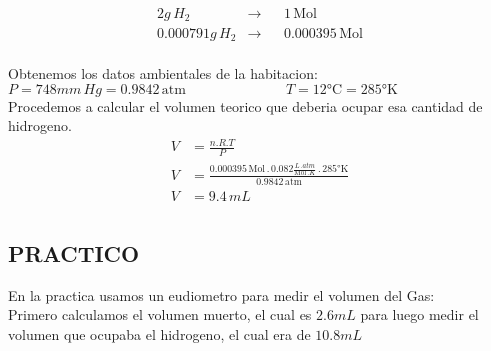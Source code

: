 \documentclass[12pt]{report}
\begin{document}
$$
\begin{aligned}
    2g \, H_2  &\rightarrow&& 1 \, \text{Mol} \\[6pt]
    0.000791g \, H_2 &\rightarrow&& 0.000395 \,\text{Mol}  \\[6pt]
\end{aligned}
$$

Obtenemos los datos ambientales de la habitacion:\\[6pt]
$P = 748mm \, Hg = 0.9842 \, \text{atm} \hspace{3cm} T= 12 \text{°C} = 285 \text{°K}$\\[6pt]
Procedemos a calcular el volumen teorico que deberia ocupar esa cantidad de hidrogeno.\\

$$
\begin{aligned}
    V&=\frac{n . R . T}{P}\\[6pt]
    V&=\frac{0.000395 \, \text{Mol}\, . \, 0.082 \frac{L \, . atm}{\text{Mol} \, . K} \, . \, 285 \text{°K}}{0.9842 \, \text{atm}}\\[6pt]
    V&=9.4 \, mL\\[6pt]
\end{aligned}
$$

\subsection{PRACTICO}

En la practica usamos un eudiometro para medir el volumen del Gas:\\

Primero calculamos el volumen muerto, el cual es $2.6mL$ para luego medir el volumen que ocupaba el hidrogeno, el cual era de $10.8mL$
\end{document}
